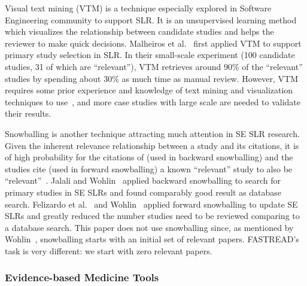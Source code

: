 \documentclass{svjour3}
\theoremstyle{break}
\begin{document}
Visual text mining (VTM) is a technique especially explored in Software Engineering community to support SLR. It is an unsupervised learning method which visualizes the relationship between candidate studies and helps the reviewer to make quick decisions. Malheiros et al.~\cite{malheiros2007visual} first applied VTM to support primary study selection in SLR. In their small-scale experiment (100 candidate studies, 31 of which are ``relevant''), VTM retrieves around 90\% of the ``relevant'' studies by spending about 30\% as much time as manual review. However, VTM requires some prior experience and knowledge of text mining and visualization techniques to use~\cite{bowes2012slurp}, and more case studies with large scale are needed to validate their results. 


Snowballing is another technique attracting much attention in SE SLR research. Given the inherent relevance relationship between a study and its citations, it is of high probability for the citations of (used in backward snowballing) and the studies cite (used in forward snowballing) a known ``relevant'' study to also be ``relevant''~\cite{kitchenham2004evidence}. Jalali and Wohlin~\cite{jalali2012systematic,wohlin2014guidelines} applied backward snowballing to search for primary studies in SE SLRs and found comparably good result as database search. Felizardo et al.~\cite{felizardo2016using} and Wohlin~\cite{wohlin2016second} applied forward snowballing to update SE SLRs and greatly reduced the number studies need to be reviewed comparing to a database search. This paper does not use snowballing since, as mentioned by Wohlin~\cite{wohlin2014guidelines}, snowballing starts with an initial set of relevant papers.
FASTREAD's task is very different: we start with zero relevant papers.



\subsubsection{Evidence-based Medicine Tools}
\label{sect: Evidence-based Medicine}
\end{document}
